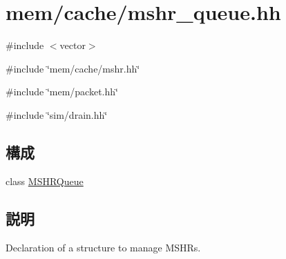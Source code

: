 \hypertarget{mshr__queue_8hh}{
\section{mem/cache/mshr\_\-queue.hh}
\label{mshr__queue_8hh}
}
{\ttfamily \#include $<$vector$>$}\par
{\ttfamily \#include \char`\"{}mem/cache/mshr.hh\char`\"{}}\par
{\ttfamily \#include \char`\"{}mem/packet.hh\char`\"{}}\par
{\ttfamily \#include \char`\"{}sim/drain.hh\char`\"{}}\par
\subsection*{構成}
\begin{DoxyCompactItemize}
\item 
class \hyperlink{classMSHRQueue}{MSHRQueue}
\end{DoxyCompactItemize}


\subsection{説明}
Declaration of a structure to manage MSHRs. 